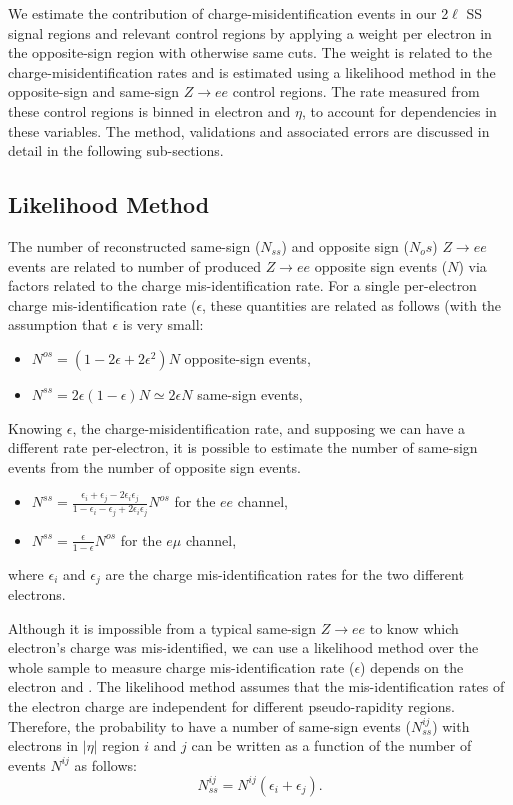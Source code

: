We estimate the contribution of charge-misidentification events in our 2$\ell$ SS signal regions and relevant control regions by applying a weight per electron in the opposite-sign region with otherwise same cuts. The weight is related to the charge-misidentification rates and is estimated using a likelihood method in the opposite-sign and same-sign $Z\rightarrow ee$ control regions. The rate measured from these control regions is binned in electron \pt and $\eta$, to account for dependencies in these variables. The method, validations and associated errors are discussed in detail in the following sub-sections.


\subsection{Likelihood Method}

The number of reconstructed same-sign ($N_{ss}$) and opposite sign ($N_os$) $Z\rightarrow ee$ events are related to number of produced $Z\rightarrow ee$ opposite sign events ($N$) via factors related to the charge mis-identification rate. For a single per-electron charge mis-identification rate ($\epsilon$, these quantities are related as follows (with the assumption that $\epsilon$ is very small: 

\begin{itemize}
\item $N^{os} = (1-2\epsilon+2\epsilon^2) N$ opposite-sign events,
\item $N^{ss} = 2\epsilon(1-\epsilon) N \simeq 2\epsilon N$ same-sign events,
\end{itemize}


Knowing $\epsilon$, the charge-misidentification rate, and supposing we can have a different rate per-electron, it is possible to estimate the number of same-sign events from the number of opposite sign events.

\begin{itemize}
\item $N^{ss} = \frac{\epsilon_i +\epsilon_j -2\epsilon_i \epsilon_j}{1-\epsilon_i -\epsilon_j +2\epsilon_i \epsilon_j} N^{os}$ for the $ee$ channel,
\item $N^{ss} = \frac{\epsilon}{1-\epsilon} N^{os}$ for the $e\mu$ channel,
\end{itemize}
where $\epsilon_i$ and $\epsilon_j$ are the charge mis-identification rates for the two
different electrons.


Although it is impossible from a typical same-sign $Z\rightarrow ee$ to know which electron's charge was mis-identified, we can use a likelihood method over the whole sample to measure charge mis-identification rate ($\epsilon$) depends on the electron \pt and \eta.  The likelihood method assumes that  the mis-identification rates of the electron charge are independent for different pseudo-rapidity regions. Therefore, the probability to have a number of same-sign events ($N^{ij}_{ss}$) with electrons in $|\eta|$ region $i$ and $j$ can be written as a function of the number of events $N^{ij}$ as follows:
\begin{equation}
N^{ij}_{ss}=N^{ij}(\epsilon_i+\epsilon_j).
\end{equation}


